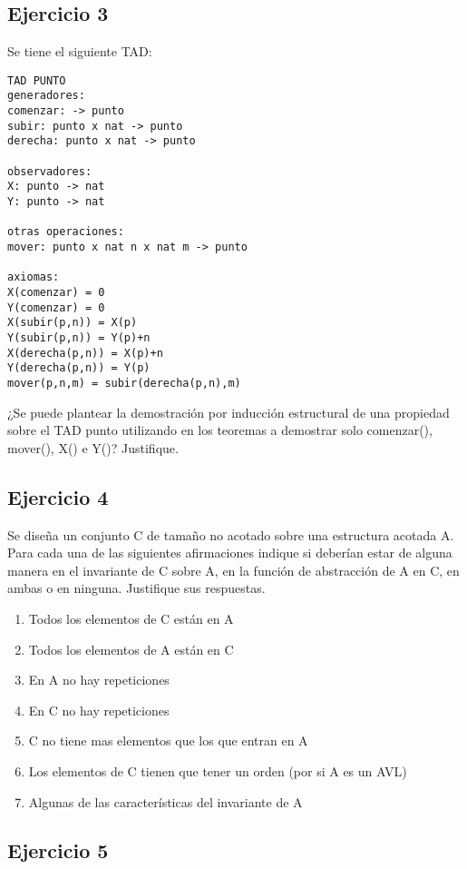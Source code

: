 \documentclass[10pt, a4paper]{article}
\begin{document}
\subsection*{Ejercicio 3}

Se tiene el siguiente TAD:

\begin{verbatim}
TAD PUNTO
generadores:
comenzar: -> punto
subir: punto x nat -> punto
derecha: punto x nat -> punto

observadores:
X: punto -> nat
Y: punto -> nat

otras operaciones:
mover: punto x nat n x nat m -> punto

axiomas:
X(comenzar) = 0
Y(comenzar) = 0
X(subir(p,n)) = X(p)
Y(subir(p,n)) = Y(p)+n
X(derecha(p,n)) = X(p)+n
Y(derecha(p,n)) = Y(p)
mover(p,n,m) = subir(derecha(p,n),m)
\end{verbatim}

¿Se puede plantear la demostraci\'on por inducci\'on estructural de una propiedad sobre el TAD punto utilizando en los teoremas a demostrar solo comenzar(), mover(), X() e Y()? Justifique.

\subsection*{Ejercicio 4}

Se dise\~na un conjunto C de tama\~no no acotado sobre una estructura acotada A. Para cada una de las siguientes afirmaciones indique si deber\'ian estar de alguna manera en el invariante de C sobre A, en la funci\'on de abstracci\'on de A en C, en ambas o en ninguna. Justifique sus respuestas.

\begin{enumerate}
 \item Todos los elementos de C est\'an en A
 \item Todos los elementos de A est\'an en C
 \item En A no hay repeticiones
 \item En C no hay repeticiones
 \item C no tiene mas elementos que los que entran en A
 \item Los elementos de C tienen que tener un orden (por si A es un AVL)
 \item Algunas de las caracter\'isticas del invariante de A
\end{enumerate}

\subsection*{Ejercicio 5}
\end{document}
